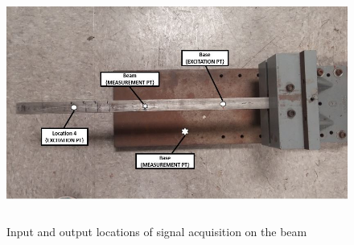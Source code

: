 \documentclass[paper=a4, fontsize=12pt]{scrartcl} %
\begin{document}
%
	\begin{figure}[H]
		\centering
		{
		\includegraphics[height=7.0cm]{TopShot_mod.jpg}
		}
		\caption{Input and output locations of signal acquisition on the beam}
		\label{fig:TopShot_mod}
	\end{figure}
%
%
\end{document}
